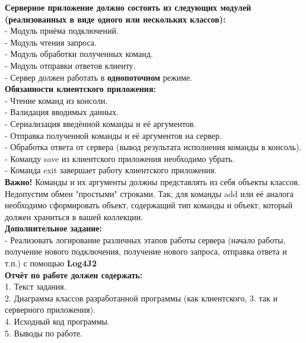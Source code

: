 \textbf{Серверное приложение должно состоять из следующих модулей (реализованных в виде одного или нескольких классов):}\\
	- Модуль приёма подключений.\\
	- Модуль чтения запроса.\\
	- Модуль обработки полученных команд.\\
	- Модуль отправки ответов клиенту.\\
	- Сервер должен работать в \textbf{однопоточном} режиме.\\
	
\textbf{Обязанности клиентского приложения:}\\
	- Чтение команд из консоли.\\
	- Валидация вводимых данных.\\
	- Сериализация введённой команды и её аргументов.\\
	- Отправка полученной команды и её аргументов на сервер.\\
	- Обработка ответа от сервера (вывод результата исполнения команды в консоль).\\
	- Команду save из клиентского приложения необходимо убрать.\\
	- Команда exit завершает работу клиентского приложения.\\
	
\textbf{Важно!} Команды и их аргументы должны представлять из себя объекты классов. Недопустим обмен "простыми" строками. Так, для команды add или её аналога необходимо сформировать объект, содержащий тип команды и объект, который должен храниться в вашей коллекции.\\

\textbf{Дополнительное задание:}\\
- Реализовать логирование различных этапов работы сервера (начало работы, получение нового подключения, получение нового запроса, отправка ответа и т.п.) с помощью \textbf{Log4J2}\\

\textbf{Отчёт по работе должен содержать:} \\
	1. Текст задания.\\
	2. Диаграмма классов разработанной программы (как клиентского, 			3. так и серверного приложения).\\
	4. Исходный код программы.\\
	5. Выводы по работе.\\
	
